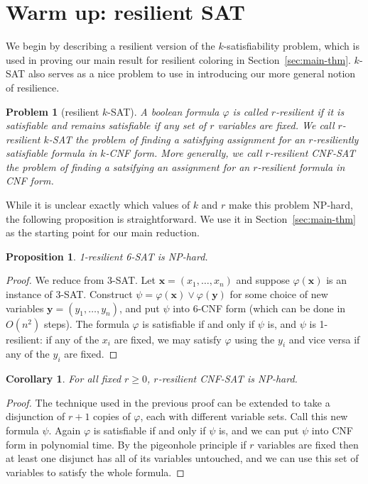 \documentclass{article}[11pt]  %
\newtheorem{cor}{Corollary}
\newtheorem{propn}{Proposition}
\newtheorem*{prob}{Problem}
\begin{document}
\section{Warm up: resilient SAT}\label{sec:resilient-sat}

We begin by describing a resilient version of the $k$-satisfiability problem,
which is used in proving our main result for resilient coloring in Section~\ref{sec:main-thm}.
$k$-SAT also serves as a nice problem to use in introducing our more general notion of resilience.

\begin{prob}[resilient $k$-SAT]
A boolean formula $\varphi$ is called \emph{$r$-resilient} if it is satisfiable
and remains satisfiable if any set of $r$ variables are fixed. We call
\emph{$r$-resilient $k$-SAT} the problem of finding a satisfying assignment for
an $r$-resiliently satisfiable formula in $k$-CNF form. More generally, we call
$r$-resilient CNF-SAT the problem of finding a satsifying an assignment for an
$r$-resilient formula in CNF form.
\end{prob}

While it is unclear exactly which values of $k$ and $r$ make this problem
NP-hard, the following proposition is straightforward. We use it in
Section~\ref{sec:main-thm} as the starting point for our main reduction. 

\begin{propn}
1-resilient 6-SAT is NP-hard.
\end{propn}
\begin{proof}
We reduce from 3-SAT. Let $\mathbf{x} = (x_1, \dots, x_n)$ and suppose
$\varphi(\mathbf{x})$ is an instance of 3-SAT.  Construct $\psi =
\varphi(\mathbf{x}) \vee \varphi(\mathbf{y})$ for some choice of new variables
$\mathbf{y} = (y_1, \dots, y_n)$, and put $\psi$ into 6-CNF form (which can be done in $O(n^2)$
steps). The formula $\varphi$ is satisfiable if and only if $\psi$ is, and
$\psi$ is 1-resilient: if any of the $x_i$ are fixed, we may satisfy $\varphi$
using the $y_i$ and vice versa if any of the $y_i$ are fixed.  
\end{proof}

\begin{cor}
For all fixed $r \geq 0$, $r$-resilient CNF-SAT is NP-hard.
\end{cor}
\begin{proof}
The technique used in the previous proof can be extended to take a disjunction
of $r+1$ copies of $\varphi$, each with different variable sets. Call this new
formula $\psi$. Again $\varphi$ is satisfiable if and only if $\psi$ is, and we
can put $\psi$ into CNF form in polynomial time. By the pigeonhole principle if
$r$ variables are fixed then at least one disjunct has all of its variables
untouched, and we can use this set of variables to satisfy the whole formula.
\end{proof}
\end{document}
